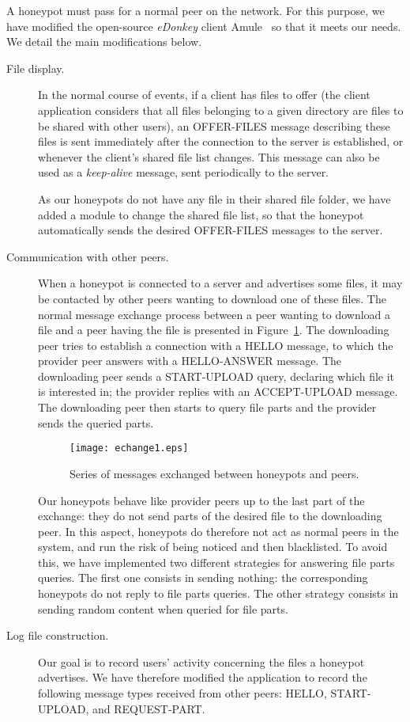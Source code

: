 \documentclass[final,
notitlepage,
narroweqnarray,
	inline,
	twoside,
]{ieee}
\begin{document}
\medskip
A honeypot must pass for a normal peer on the network. For this
purpose, we have modified the open-source {\em eDonkey} client
Amule~\cite{amule} so that it meets our
needs. 
We detail the main
modifications  below.
\begin{description}
\item[File display.]
In the normal course of events, if a client has files
to offer (the client application considers that all files belonging
to a given directory are files to be shared with other users),
an OFFER-FILES message describing these files is sent immediately after the
connection to the server is established,
or whenever the client's shared file list changes.
This message can also be used as a
{\em keep-alive} message, sent periodically to the server. 

As our honeypots do not have any file in their shared file folder, we have added a module to
change the shared file list,
so that the honeypot automatically sends the desired OFFER-FILES messages to the server.
\item[Communication with other peers.] When a honeypot is connected to a server and advertises some files,
it may be contacted by other peers wanting to download one of these files.
The normal message
exchange process between a peer wanting to download a file  and a peer having the file
is presented in Figure~\ref{fig-file-query}. 
The downloading peer tries to establish a connection
with a HELLO message,
to which the provider peer answers with a HELLO-ANSWER message.
The downloading peer sends a
START-UPLOAD query, declaring which file it is interested in;
 the provider replies with an
ACCEPT-UPLOAD message.
The downloading peer then starts to query file parts  and
the provider sends the queried parts.

\begin{figure}[h!]
  \centering
  \texttt{[image: echange1.eps]}
  \caption{Series of messages exchanged between honeypots and peers.}
  \label{fig-file-query}
\end{figure}

Our honeypots behave like provider peers up to
the last part of the exchange: they do not send parts of the desired file
to the downloading peer.
In this aspect, honeypots do therefore not act as normal
peers in the system, and run the risk of being noticed and then blacklisted.
To avoid this,
we have implemented two different strategies for answering file parts 
queries.
The first one consists in sending nothing:
the corresponding honeypots do not reply to file parts queries.
The other strategy consists in sending random content when queried
for file parts.
\item[Log file construction.]Our goal is to record users' activity concerning the files a honeypot
advertises.
We have therefore modified the application to record the following
message types received from other peers: HELLO, START-UPLOAD, and REQUEST-PART. 
\end{description}
\end{document}
